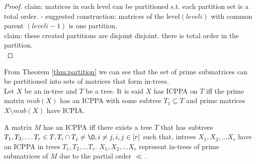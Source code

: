 \documentclass{llncs}
\begin{document}
\begin{proof}
claim: matrices in each level can be partitioned s.t.  each partition
set is a total order.  - suggested construction: matrices of the
level$(level i)$ with common parent
$(level i-1)$ is one partition.\\
claim: these created partitions are disjoint
disjoint. there is total order in the partition.\\

\end{proof}

From Theorem \ref{thm:partition} we can see that the set of prime
submatrices can be partitioned into sets of matrices that form in-trees.\\


Let $X$ be an in-tree and $T$ be a tree. It is said $X$ has ICPPA on
$T$ iff the prime matrix $mub(X)$ has an ICPPA with some subtree $T_1
\subseteq T$ and prime
matrices $X \setminus mub(X)$ have ICPIA.

\begin{lemma}
\label{lem:subicppa}
A matrix $M$ has an ICPPA iff there exists a tree $T$ that has
subtrees $T_1, T_2, \dots T_r \in T, T_i \cap T_j \ne \O, i \ne j, i,j
\in [r]$ such that, intrees $X_1, X_2, \dots X_r$ have an ICPPA in
trees $T_1, T_2, \dots T_r$. $X_1, X_2, \dots X_r$ represent
in-trees of prime submatrices of $M$ due to the partial order
$\ll$.
\end{lemma}
\end{document}
